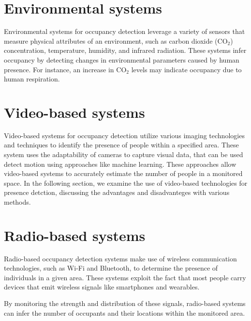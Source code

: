 \section{Environmental systems}\label{sec:presence_env}
Environmental systems for occupancy detection leverage a variety of sensors that measure physical attributes of an environment, such as carbon dioxide ($\text{CO}_{2}$) concentration, temperature, humidity, and infrared radiation.
These systems infer occupancy by detecting changes in environmental parameters caused by human presence.
For instance, an increase in $\text{CO}_{2}$ levels may indicate occupancy due to human respiration.\cite{longoAccurateOccupancyEstimation2019}


\section{Video-based systems}\label{sec:presence_video}
Video-based systems for occupancy detection utilize various imaging technologies and techniques to identify the presence of people within a specified area. 
These system uses the adaptability of cameras to capture visual data, that can be used detect motion using approaches like machine learning. 
These approaches allow video-based systems to accurately estimate the number of people in a monitored space.
In the following section, we examine the use of video-based technologies for presence detction, discussing the advantages and disadvanteges with various methods.


\section{Radio-based systems}\label{sec:presence_radio}
Radio-based occupancy detection systems make use of wireless communication technologies, such as Wi-Fi and Bluetooth, to determine the presence of individuals in a given area.
These systems exploit the fact that most people carry devices that emit wireless signals like smartphones and wearables.

By monitoring the strength and distribution of these signals, radio-based systems can infer the number of occupants and their locations within the monitored area.\cite{longoAccurateOccupancyEstimation2019, teissedre-2019}
